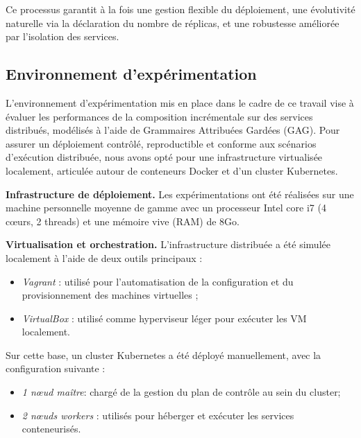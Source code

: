 Ce processus garantit à la fois une gestion flexible du déploiement, une évolutivité naturelle via la déclaration du nombre de réplicas, et une robustesse améliorée par l’isolation des services.



\subsection{Environnement d’expérimentation}{}
L’environnement d’expérimentation mis en place dans le cadre de ce travail vise à évaluer les performances de la composition incrémentale sur des services distribués, modélisés à l’aide de Grammaires Attribuées Gardées (GAG). Pour assurer un déploiement contrôlé, reproductible et conforme aux scénarios d’exécution distribuée, nous avons opté pour une infrastructure virtualisée localement, articulée autour de conteneurs Docker et d’un cluster Kubernetes.

\textbf{Infrastructure de déploiement.} Les expérimentations ont été réalisées sur une machine personnelle moyenne de gamme avec un processeur Intel core i7 (4 cœurs, 2 threads) et une mémoire vive (RAM) de 8Go.

\textbf{Virtualisation et orchestration.} 
L’infrastructure distribuée a été simulée localement à l’aide de deux outils principaux :
\begin{itemize}
  \item \textit{Vagrant} : utilisé pour l’automatisation de la configuration et du provisionnement des machines virtuelles ;
  \item \textit{VirtualBox} : utilisé comme hyperviseur léger pour exécuter les VM localement.
\end{itemize}

Sur cette base, un cluster Kubernetes a été déployé manuellement, avec la configuration suivante :
\begin{itemize}
  \item \textit{1 nœud maître}: chargé de la gestion du plan de contrôle au sein du cluster;
  \item \textit{2 nœuds workers} : utilisés pour héberger et exécuter les services conteneurisés.
\end{itemize}

